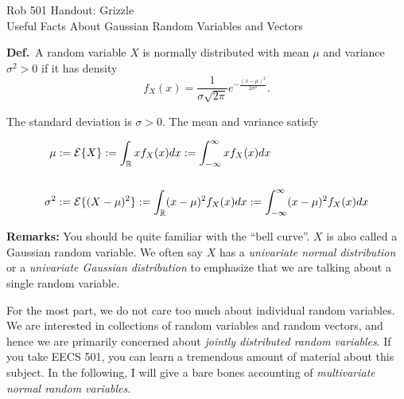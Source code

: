 \documentclass[letterpaper]{article}
\newcommand{\real}{\mathbb R}  %
\begin{document}
\baselineskip=48pt  %


\setlength{\parskip}{.3in}
\setlength{\itemsep}{.3in}

\pagestyle{plain}

{\Large \bf
\begin{center}
Rob 501 Handout: Grizzle \\
Useful Facts About Gaussian Random Variables and Vectors
\end{center}
}



\Large

\noindent \textbf{Def.}~A random variable $X$ is normally distributed with mean $\mu$ and variance $\sigma^2 >0$ if it has density
$$ f_X(x) = \frac{1}{\sigma \sqrt{2 \pi}} e^{-\frac{(x-\mu)^2}{2 \sigma^2}}.$$

The standard deviation is $\sigma>0$. The mean and variance satisfy

\begin{align*} \mu &:= {\cal E} \{ X\} := \int_{\real} x f_X(x) dx := \int_{-\infty}^{\infty} x f_X(x) dx \\
\\
\sigma^2&:= {\cal E} \{ (X-\mu)^2 \} := \int_{\real} (x-\mu)^2 f_X(x) dx := \int_{-\infty}^{\infty} (x-\mu)^2 f_X(x) dx
\end{align*}



\noindent \textbf{Remarks:} You should be quite familiar with the  ``bell curve''. $X$ is also called a Gaussian random variable.  We often say $X$ has a \textit{univariate normal distribution} or a \textit{univariate Gaussian distribution} to emphasize that we are talking about a single random variable.

For the most part, we do not care too much about individual random variables. We are interested in collections of random variables and random vectors, and hence we are primarily concerned about \textit{jointly distributed random variables}. If you take EECS 501, you can learn a tremendous amount of material about this subject. In the following, I will give a bare bones accounting of \textit{multivariate normal random variables}. %
\end{document}
